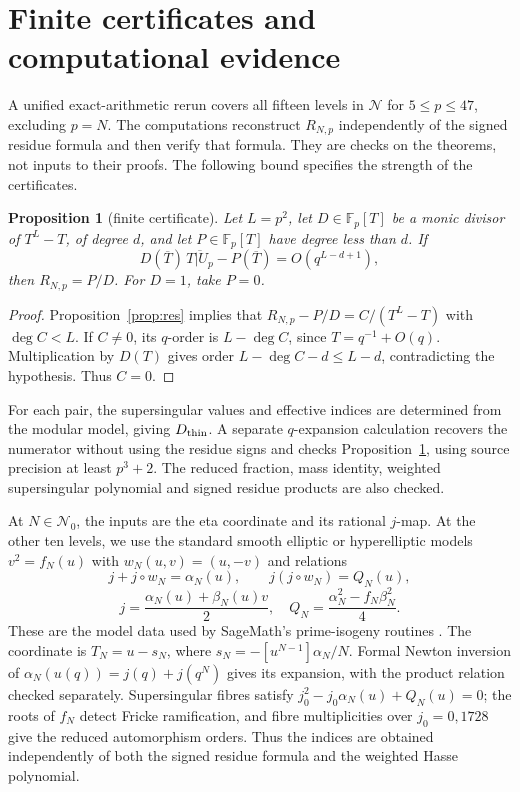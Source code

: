 \documentclass[11pt,a4paper]{article}
\numberwithin{equation}{section}
\newtheorem{proposition}[theorem]{Proposition}
\theoremstyle{definition}
\theoremstyle{remark}
\newcommand{\Fp}{\mathbb F_p}
\begin{document}
\section{Finite certificates and computational evidence}\label{sec:comp}
A unified exact-arithmetic rerun covers all fifteen levels in $\mathcal N$
for $5\le p\le47$, excluding $p=N$. The computations reconstruct
$R_{N,p}$ independently of the signed residue formula and then verify
that formula. They are checks on the theorems, not inputs to their proofs.
The following bound specifies the strength of the certificates.

\begin{proposition}[finite certificate]\label{prop:certificate}
Let $L=p^2$, let $D\in\Fp[T]$ be a monic divisor of $T^L-T$, of degree $d$, and
let $P\in\Fp[T]$ have degree less than $d$. If
\[
D(\overline T)\,\overline{T|U_p}-P(\overline T)=O(q^{L-d+1}),
\]
then $R_{N,p}=P/D$. For $D=1$, take $P=0$.
\end{proposition}
\begin{proof}
Proposition~\ref{prop:res} implies that
$R_{N,p}-P/D=C/(T^L-T)$ with $\deg C<L$.
If $C\ne0$, its $q$-order is $L-\deg C$, since $T=q^{-1}+O(q)$.
Multiplication by $D(T)$ gives order $L-\deg C-d\le L-d$, contradicting the
hypothesis. Thus $C=0$.
\end{proof}

For each pair, the supersingular values and effective indices are determined
from the modular model, giving $D_{\rm thin}$. A separate $q$-expansion
calculation recovers the numerator without using the residue signs and
checks Proposition~\ref{prop:certificate}, using source precision at least
$p^3+2$. The reduced fraction, mass identity, weighted supersingular
polynomial and signed residue products are also checked.

At $N\in\mathcal N_0$, the inputs are the eta coordinate and its rational
$j$-map. At the other ten levels, we use the standard smooth elliptic or
hyperelliptic models $v^2=f_N(u)$ with $w_N(u,v)=(u,-v)$ and relations
\[
j+j\circ w_N=\alpha_N(u),\qquad
j(j\circ w_N)=Q_N(u),
\]
\[
j=\frac{\alpha_N(u)+\beta_N(u)v}{2},
\quad Q_N=\frac{\alpha_N^2-f_N\beta_N^2}{4}.
\]
These are the model data used by SageMath's prime-isogeny routines
\citep{SageModels}. The coordinate is $T_N=u-s_N$, where
$s_N=-[u^{N-1}]\alpha_N/N$. Formal Newton inversion of
$\alpha_N(u(q))=j(q)+j(q^N)$ gives its expansion, with the product relation
checked separately. Supersingular fibres satisfy
$j_0^2-j_0\alpha_N(u)+Q_N(u)=0$; the roots of $f_N$ detect Fricke
ramification, and fibre multiplicities over $j_0=0,1728$ give the reduced
automorphism orders. Thus the indices are obtained independently of both
the signed residue formula and the weighted Hasse polynomial.
\end{document}
